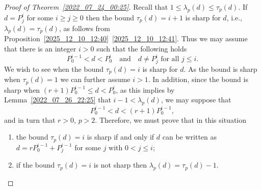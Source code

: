 \documentclass[12pt,reqno]{amsart}%
\theoremstyle{definition}
\theoremstyle{remark}
\newcommand{\lam}{\lambda}
\begin{document}
\begin{proof}[Proof of Theorem~\ref{2022_07_24_00:25}]
Recall that $1 \leq \lam_p(d) \leq \tau_p(d)$.
If $d=P_j^i$ for some $i\geq j\geq0$ then the bound $\tau_p(d)=i+1$ is sharp for $d$, i.e., $\lam_p(d)=\tau_p(d)$, as follows from Proposition~\ref{2025_12_10_12:40}~\ref{2025_12_10_12:41}.
Thus we may assume that there is an integer $i>0$ such that the following holds
\[ P_0^{i-1} < d < P_0^i \quad \text{and} \quad \text{$d\neq P_j^i$ for all $j\leq i$}. \]
We wish to see when the bound $\tau_p(d)=i$ is sharp for $d$.
As the bound is sharp when $\tau_p(d)=1$ we can further assume $i > 1$.
In addition, since the bound is sharp when $(r+1)P_0^{i-1} \leq d < P_0^i$, as
this implies by Lemma~\ref{2022_07_26_22:25} that $i-1<\lam_p(d)$,
we may suppose that
\[ P_0^{i-1} < d < (r+1) P_0^{i-1}, \]
and in turn that $r>0$, $p>2$.
Therefore, we must prove that in this situation
\begin{enumerate}[\upshape (i)]
    \item the bound $\tau_p(d) = i$ is sharp if and only if $d$ can be written as $d= r P_0^{i-1} + P_j^{i-1}$ for some $j$ with $0<j\leq i$;
    \item if the bound $\tau_p(d) = i$ is not sharp then $\lam_p(d) = \tau_p(d) - 1$.
\end{enumerate}


\end{proof}
\end{document}
